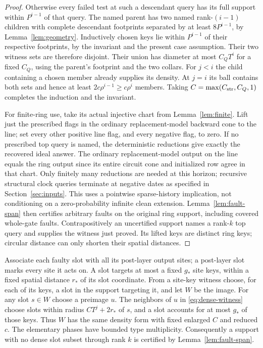 \begin{proof}
Otherwise every failed test at such a descendant query has its full support within $P^{i-1}$ of that query. The named parent has two named rank-$(i-1)$ children with complete descendant footprints separated by at least $8P^{i-1}$, by Lemma~\ref{lem:geometry}. Inductively chosen keys lie within $P^{i-1}$ of their respective footprints, by the invariant and the present case assumption. Their two witness sets are therefore disjoint. Their union has diameter at most $C_QT^i$ for a fixed $C_Q$, using the parent's footprint and the two collars. For $j<i$ the child containing a chosen member already supplies its density. At $j=i$ its ball contains both sets and hence at least $2c\rho^{i-1}\ge c\rho^i$ members. Taking $C=\max(C_{\rm str},C_Q,1)$ completes the induction and the invariant.

For finite-ring use, take its actual injective chart from Lemma~\ref{lem:finite}. Lift just the prescribed flags in the ordinary replacement-model backward cone to the line; set every other positive line flag, and every negative flag, to zero. If no prescribed top query is named, the deterministic reductions give exactly the recovered ideal answer. The ordinary replacement-model output on the line equals the ring output since its entire circuit cone and initialized row agree in that chart. Only finitely many reductions are needed at this horizon; recursive structural clock queries terminate at negative dates as specified in Section~\ref{sec:inputs}. This uses a pointwise sparse-history implication, not conditioning on a zero-probability infinite clean extension. Lemma~\ref{lem:fault-span} then certifies arbitrary faults on the original ring support, including covered whole-gate faults. Contrapositively an uncertified support names a rank-$k$ top query and supplies the witness just proved. Its lifted keys are distinct ring keys; circular distance can only shorten their spatial distances.
\end{proof}

Associate each faulty slot with all its post-layer output sites; a post-layer slot marks every site it acts on. A slot targets at most a fixed $g_*$ site keys, within a fixed spatial distance $r_*$ of its slot coordinate. From a site-key witness choose, for each of its keys, a slot in the support targeting it, and let $W$ be the image. For any slot $s\in W$ choose a preimage $u$. The neighbors of $u$ in \eqref{eq:dense-witness} choose slots within radius $CT^j+2r_*$ of $s$, and a slot accounts for at most $g_*$ of those keys. Thus $W$ has the same density form with fixed enlarged $C$ and reduced $c$. The elementary phases have bounded type multiplicity. Consequently a support with no dense slot subset through rank $k$ is certified by Lemma~\ref{lem:fault-span}.

